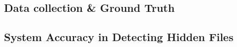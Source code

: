 \subsection{Data collection \& Ground Truth}

\subsection{System Accuracy in Detecting Hidden Files}


